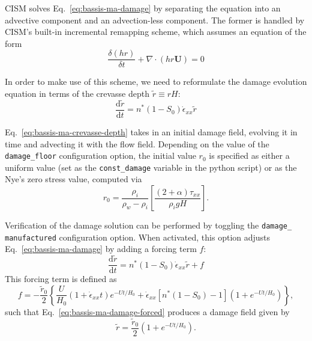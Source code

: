 \documentclass{article}
\begin{document}
CISM solves Eq.~\ref{eq:bassis-ma-damage} by separating the equation into an advective component and an advection-less component. The former is handled by CISM's built-in incremental remapping scheme, which assumes an equation of the form
\begin{equation}
   \frac{\delta \left( hr \right)}{\delta t} + \nabla\cdot\left( hr\mathbf{U} \right) = 0
   \label{eq:advection}
\end{equation}

In order to make use of this scheme, we need to reformulate the damage evolution equation in terms of the crevasse depth $\tilde{r} \equiv rH$:
\begin{equation}
   \frac{\mathrm{d}\tilde{r}}{\mathrm{d}t} = n^* \left(1-S_0\right) \dot{\epsilon}_{xx} \tilde{r}
   \label{eq:bassis-ma-crevasse-depth}
\end{equation}

Eq.~\ref{eq:bassis-ma-crevasse-depth} takes in an initial damage field, evolving it in time and advecting it with the flow field. Depending on the value of the \texttt{damage\_floor} configuration option, the initial value $r_0$ is specified as either a uniform value (set as the \texttt{const\_damage} variable in the python script) or as the Nye's zero stress value, computed via \citep{Jezek,Nick-et-al,Nye}
\begin{equation}
   r_0 = \frac{\rho_i}{\rho_w-\rho_i} \left[\frac{\left(2+\alpha\right) \tau_{xx}}{\rho_i gH}\right].
   \label{eq:nye-damage}
\end{equation}

Verification of the damage solution can be performed by toggling the \texttt{damage\_} \texttt{manufactured} configuration option. When activated, this option adjusts Eq.~\ref{eq:bassis-ma-damage} by adding a forcing term $f$:
\begin{equation}
   \frac{\mathrm{d}\tilde{r}}{\mathrm{d}t} = n^* \left(1-S_0\right) \dot{\epsilon}_{xx} \tilde{r} + f
   \label{eq:bassis-ma-damage-forced}
\end{equation}
This forcing term is defined as
\begin{equation}
   f = -\frac{\tilde{r}_0}{2} \left\{\frac{U}{H_0} \left(1+\dot{\epsilon}_{xx}t\right) e^{-Ut/H_0} + \dot{\epsilon}_{xx} \left[ n^*\left(1-S_0\right)-1 \right] \left(1+e^{-Ut/H_0}\right)\right\},
   \label{eq:damage-forcing}
\end{equation}
such that Eq.~\ref{eq:bassis-ma-damage-forced} produces a damage field given by
\begin{equation}
   \tilde{r} = \frac{\tilde{r}_0}{2} \left(1+e^{-Ut/H_0}\right).
   \label{eq:manufactured-damage}
\end{equation}



\end{document}
